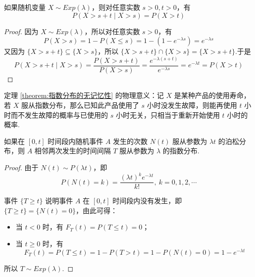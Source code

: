 \begin{theorem}
    \indent 如果随机变量 $X \sim Exp(\lambda)$，则对任意实数 $s>0, t>0$，有
    \begin{equation}
        P(X > s+t \mid X>s) = P(X>t)
    \end{equation}
\end{theorem}

\begin{proof}
    因为 $X \sim Exp(\lambda)$，所以对任意实数 $s>0$，有
    $$
    P(X>s) = 1 - P(X \leqslant s) = 1 - (1 - e^{-\lambda s}) = e^{-\lambda s}
    $$
    又因为 $\{ X > s+t \} \subseteq \{ X>s \}$，所以 $\{ X > s+t \} \cap \{ X>s \} = \{ X > s+t \}$.于是
    $$
    P(X > s+t \mid X>s) = \dfrac{P(X > s+t)}{P(X>s)} = \dfrac{e^{-\lambda (s+t)}}{e^{-\lambda s}} = e^{-\lambda t} = P(X > t)
    $$
\end{proof}

\begin{note}
    \indent 定理 \ref{theorem:指数分布的无记忆性} 的物理意义：记 $X$ 是某种产品的使用寿命，若 $X$ 服从指数分布，那么已知此产品使用了 $s$ 小时没发生故障，则能再使用 $t$ 小时而不发生故障的概率与已使用的 $s$ 小时无关，只相当于重新开始使用 $t$ 小时的概率.
\end{note}

\begin{conclusion}[][泊松分布与指数分布的关系]
    \indent 如果在 $[0,t]$ 时间段内随机事件 $A$ 发生的次数 $N(t)$ 服从参数为 $\lambda t$ 的泊松分布，则 $A$ 相邻两次发生的时间间隔 $T$ 服从参数为 $\lambda$ 的指数分布.
\end{conclusion}

\begin{proof}
    由于 $N(t) \sim P(\lambda t)$，即
    $$
    P(N(t) = k) = \dfrac{(\lambda t)^k e^{- \lambda t}}{k!},\ k=0,1,2,\cdots
    $$

    事件 $\{ T \geqslant t \}$ 说明事件 $A$ 在 $[0,t]$ 时间段内没有发生，即 $\{ T \geqslant t \} = \{ N(t) = 0 \}$，由此可得：
    \begin{itemize}
        \item 当 $t<0$ 时，有 $F_T(t) = P(T \leqslant t) = 0$；
        \item 当 $t \geqslant 0$ 时，有
        $$
        F_T(t) = P(T \leqslant t) = 1 - P(T>t) = 1 - P(N(t) = 0) = 1 - e^{-\lambda t}
        $$
    \end{itemize}
    所以 $T \sim Exp(\lambda)$.
\end{proof}

